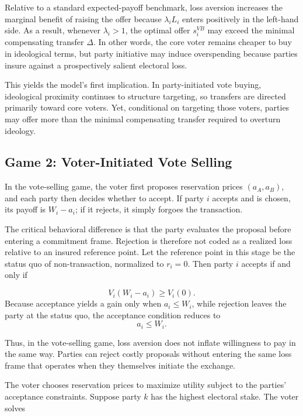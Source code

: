 \documentclass[11pt]{article}
\begin{document}
Relative to a standard expected-payoff benchmark, loss aversion increases the marginal benefit of raising the offer because $\lambda_iL_i$ enters positively in the left-hand side. As a result, whenever $\lambda_i>1$, the optimal offer $s_i^{VB}$ may exceed the minimal compensating transfer $\Delta$. In other words, the core voter remains cheaper to buy in ideological terms, but party initiative may induce overspending because parties insure against a prospectively salient electoral loss.

This yields the model's first implication. In party-initiated vote buying, ideological proximity continues to structure targeting, so transfers are directed primarily toward core voters. Yet, conditional on targeting those voters, parties may offer more than the minimal compensating transfer required to overturn ideology.

\subsection*{Game 2: Voter-Initiated Vote Selling}

In the vote-selling game, the voter first proposes reservation prices $(a_A,a_B)$, and each party then decides whether to accept. If party $i$ accepts and is chosen, its payoff is $W_i-a_i$; if it rejects, it simply forgoes the transaction.

The critical behavioral difference is that the party evaluates the proposal before entering a commitment frame. Rejection is therefore not coded as a realized loss relative to an insured reference point. Let the reference point in this stage be the status quo of non-transaction, normalized to $r_i=0$. Then party $i$ accepts if and only if

\begin{equation}
V_i(W_i-a_i)\geq V_i(0).
\end{equation}
Because acceptance yields a gain only when $a_i\leq W_i$, while rejection leaves the party at the status quo, the acceptance condition reduces to
\begin{equation}
a_i\leq W_i.
\end{equation}

Thus, in the vote-selling game, loss aversion does not inflate willingness to pay in the same way. Parties can reject costly proposals without entering the same loss frame that operates when they themselves initiate the exchange.

The voter chooses reservation prices to maximize utility subject to the parties' acceptance constraints. Suppose party $k$ has the highest electoral stake. The voter solves
\end{document}
